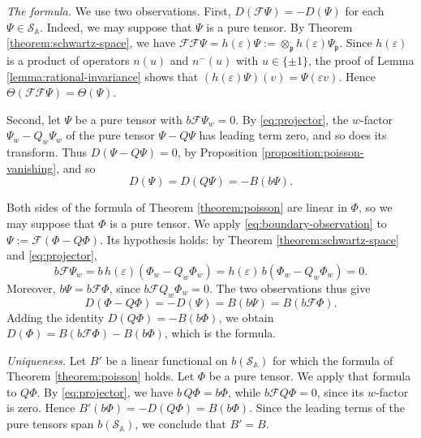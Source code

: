 \documentclass[reqno]{amsart}
\theoremstyle{plain}
\theoremstyle{definition}
\theoremstyle{itplain}
\numberwithin{equation}{section}
\numberwithin{theorem}{section}
\begin{document}
\emph{The formula.}  We use two observations.  First, $D(\mathcal{F} \Psi) = - D(\Psi)$ for each $\Psi \in \mathcal{S}_{\mathbb{A}}$.  Indeed, we may suppose that $\Psi$ is a pure tensor.  By Theorem \ref{theorem:schwartz-space}, we have $\mathcal{F} \mathcal{F} \Psi = h(\varepsilon) \Psi := \otimes_{\mathfrak{p}} h(\varepsilon) \Psi_{\mathfrak{p}}$.  Since $h(\varepsilon)$ is a product of operators $n(u)$ and $n^-(u)$ with $u \in \{\pm 1\}$, the proof of Lemma \ref{lemma:rational-invariance} shows that $(h(\varepsilon) \Psi)(v) = \Psi(\varepsilon v)$.  Hence $\Theta(\mathcal{F} \mathcal{F} \Psi) = \Theta(\Psi)$.

Second, let $\Psi$ be a pure tensor with $b \mathcal{F} \Psi_w = 0$.  By \eqref{eq:projector}, the $w$-factor $\Psi_w - Q_w \Psi_w$ of the pure tensor $\Psi - Q \Psi$ has leading term zero, and so does its transform.  Thus $D(\Psi - Q \Psi) = 0$, by Proposition \ref{proposition:poisson-vanishing}, and so
\begin{equation}\label{eq:boundary-observation}
  D(\Psi) = D(Q \Psi) = - B(b \Psi).
\end{equation}

Both sides of the formula of Theorem \ref{theorem:poisson} are linear in $\Phi$, so we may suppose that $\Phi$ is a pure tensor.  We apply \eqref{eq:boundary-observation} to $\Psi := \mathcal{F}(\Phi - Q \Phi)$.  Its hypothesis holds: by Theorem \ref{theorem:schwartz-space} and \eqref{eq:projector},
\begin{equation*}
  b \mathcal{F} \Psi_w = b \, h(\varepsilon) (\Phi_w - Q_w \Phi_w) = h(\varepsilon) \, b (\Phi_w - Q_w \Phi_w) = 0.
\end{equation*}
Moreover, $b \Psi = b \mathcal{F} \Phi$, since $b \mathcal{F} Q_w \Phi_w = 0$.  The two observations thus give
\begin{equation*}
  D(\Phi - Q \Phi) = - D(\Psi) = B(b \Psi) = B(b \mathcal{F} \Phi).
\end{equation*}
Adding the identity $D(Q \Phi) = - B(b \Phi)$, we obtain $D(\Phi) = B(b \mathcal{F} \Phi) - B(b \Phi)$, which is the formula.

\emph{Uniqueness.}  Let $B'$ be a linear functional on $b(\mathcal{S}_{\mathbb{A}})$ for which the formula of Theorem \ref{theorem:poisson} holds.  Let $\Phi$ be a pure tensor.  We apply that formula to $Q \Phi$.  By \eqref{eq:projector}, we have $b \, Q \Phi = b \Phi$, while $b \mathcal{F} Q \Phi = 0$, since its $w$-factor is zero.  Hence $B'(b \Phi) = - D(Q \Phi) = B(b \Phi)$.  Since the leading terms of the pure tensors span $b(\mathcal{S}_{\mathbb{A}})$, we conclude that $B' = B$.
\end{document}
